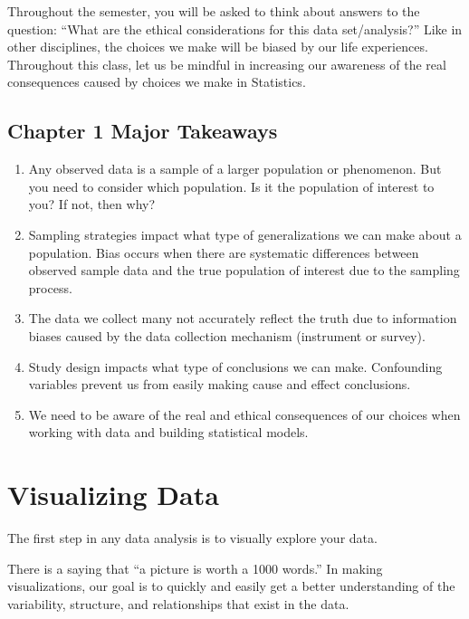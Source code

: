 \documentclass[
]{book}
\begin{document}
Throughout the semester, you will be asked to think about answers to the question: ``What are the ethical considerations for this data set/analysis?'' Like in other disciplines, the choices we make will be biased by our life experiences. Throughout this class, let us be mindful in increasing our awareness of the real consequences caused by choices we make in Statistics.

\hypertarget{chapter-1-major-takeaways}{%
\section{Chapter 1 Major Takeaways}\label{chapter-1-major-takeaways}}

\begin{enumerate}
\def\labelenumi{\arabic{enumi}.}
\item
  Any observed data is a sample of a larger population or phenomenon. But you need to consider which population. Is it the population of interest to you? If not, then why?
\item
  Sampling strategies impact what type of generalizations we can make about a population. Bias occurs when there are systematic differences between observed sample data and the true population of interest due to the sampling process.
\item
  The data we collect many not accurately reflect the truth due to information biases caused by the data collection mechanism (instrument or survey).
\item
  Study design impacts what type of conclusions we can make. Confounding variables prevent us from easily making cause and effect conclusions.
\item
  We need to be aware of the real and ethical consequences of our choices when working with data and building statistical models.
\end{enumerate}

\hypertarget{visualizing-data}{%
\chapter{Visualizing Data}\label{visualizing-data}}

The first step in any data analysis is to visually explore your data.

There is a saying that ``a picture is worth a 1000 words.'' In making visualizations, our goal is to quickly and easily get a better understanding of the variability, structure, and relationships that exist in the data.
\end{document}
